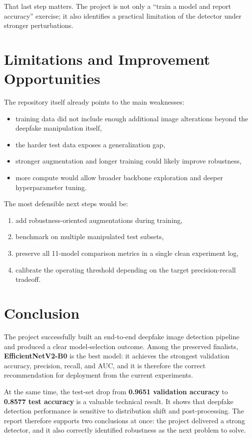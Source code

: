 \documentclass[11pt]{article}
\begin{document}
That last step matters. The project is not only a ``train a model and report accuracy'' exercise; it also identifies a practical limitation of the detector under stronger perturbations.

\section{Limitations and Improvement Opportunities}

The repository itself already points to the main weaknesses:
\begin{itemize}[leftmargin=1.5em]
    \item training data did not include enough additional image alterations beyond the deepfake manipulation itself,
    \item the harder test data exposes a generalization gap,
    \item stronger augmentation and longer training could likely improve robustness,
    \item more compute would allow broader backbone exploration and deeper hyperparameter tuning.
\end{itemize}

The most defensible next steps would be:
\begin{enumerate}[leftmargin=1.5em]
    \item add robustness-oriented augmentations during training,
    \item benchmark on multiple manipulated test subsets,
    \item preserve all 11-model comparison metrics in a single clean experiment log,
    \item calibrate the operating threshold depending on the target precision-recall tradeoff.
\end{enumerate}

\section{Conclusion}

The project successfully built an end-to-end deepfake image detection pipeline and produced a clear model-selection outcome. Among the preserved finalists, \textbf{EfficientNetV2-B0} is the best model: it achieves the strongest validation accuracy, precision, recall, and AUC, and it is therefore the correct recommendation for deployment from the current experiments.

At the same time, the test-set drop from \textbf{0.9651 validation accuracy} to \textbf{0.8577 test accuracy} is a valuable technical result. It shows that deepfake detection performance is sensitive to distribution shift and post-processing. The report therefore supports two conclusions at once: the project delivered a strong detector, and it also correctly identified robustness as the next problem to solve.
\end{document}
